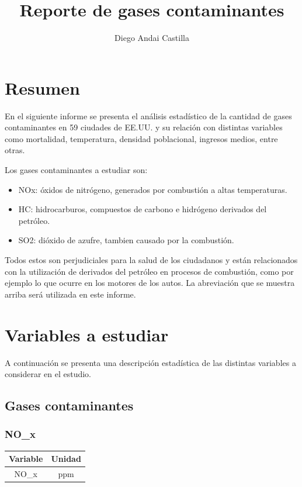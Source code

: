 \documentclass[11pt]{article}
\begin{document}
\author{Diego Andai Castilla}
\title{Reporte de gases contaminantes}
\maketitle

\section{Resumen}

En el siguiente informe se presenta el análisis estadístico de la cantidad de gases contaminantes en 59 ciudades de EE.UU. y su relación con distintas variables como mortalidad, temperatura, densidad poblacional, ingresos medios, entre otras.

Los gases contaminantes a estudiar son:

\begin{itemize}
    \item NOx: óxidos de nitrógeno, generados por combustión a altas temperaturas.
    \item HC: hidrocarburos, compuestos de carbono e hidrógeno derivados del petróleo.
    \item SO2: dióxido de azufre, tambien causado por la combustión.
\end{itemize}

Todos estos son perjudiciales para la salud de los ciudadanos y están relacionados con la utilización de derivados del petróleo en procesos de combustión, como por ejemplo lo que ocurre en los motores de los autos. La abreviación que se muestra arriba será utilizada en este informe.

\section{Variables a estudiar}

A continuación se presenta una descripción estadística de las distintas variables a considerar en el estudio.

\subsection{Gases contaminantes}

\subsubsection{NO_x}

\begin{center}
\begin{tabular}{|c|c|}
    \hline
    Variable & Unidad  \\ \hline
    NO_x & ppm \\
    \hline
\end{tabular}
\end{center}
\end{document}
